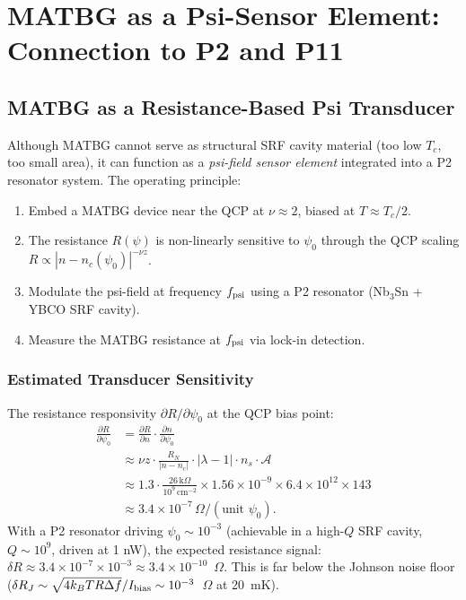 \documentclass[11pt]{article}
\newcommand{\ee}[1]{\times 10^{#1}}
\newcommand{\nuFill}{\nu}
\newcommand{\lambdabound}{1.56\ee{-9}}
\begin{document}
\section{MATBG as a Psi-Sensor Element: Connection to P2 and P11}
\label{sec:sensor}

\subsection{MATBG as a Resistance-Based Psi Transducer}

Although MATBG cannot serve as structural SRF cavity material (too low
$T_c$, too small area), it can function as a \emph{psi-field sensor
element} integrated into a P2 resonator system. The operating principle:

\begin{enumerate}
  \item Embed a MATBG device near the QCP at $\nuFill \approx 2$,
    biased at $T \approx T_c/2$.
  \item The resistance $R(\psi)$ is non-linearly sensitive to $\psi_0$
    through the QCP scaling $R \propto |n - n_c(\psi_0)|^{-\nu z}$.
  \item Modulate the psi-field at frequency $f_{\rm psi}$ using a P2
    resonator (Nb$_3$Sn + YBCO SRF cavity).
  \item Measure the MATBG resistance at $f_{\rm psi}$ via lock-in
    detection.
\end{enumerate}

\subsubsection{Estimated Transducer Sensitivity}

The resistance responsivity $\partial R/\partial\psi_0$ at the QCP bias point:
\begin{align}
  \frac{\partial R}{\partial\psi_0}
    &= \frac{\partial R}{\partial n} \cdot
       \frac{\partial n}{\partial\psi_0} \nonumber\\
    &\approx \nu z \cdot \frac{R_N}{|n - n_c|} \cdot
       |\lambda-1| \cdot n_s \cdot \mathcal{A} \nonumber\\
    &\approx 1.3 \cdot \frac{26\,\text{k}\Omega}{10^9\,\text{cm}^{-2}}
       \times \lambdabound \times 6.4\ee{12} \times 143 \nonumber\\
    &\approx 3.4\ee{-7}\,\Omega/(\text{unit } \psi_0).
  \label{eq:R_responsivity}
\end{align}
With a P2 resonator driving $\psi_0 \sim 10^{-3}$ (achievable in a high-$Q$
SRF cavity, $Q \sim 10^9$, driven at 1 nW), the expected resistance signal:
$\delta R \approx 3.4\ee{-7} \times 10^{-3} \approx 3.4\ee{-10}$~$\Omega$.
This is far below the Johnson noise floor ($\delta R_J \sim
\sqrt{4k_BT R \Delta f} / I_{\rm bias} \sim 10^{-3}$~$\Omega$ at 20~mK).
\end{document}
